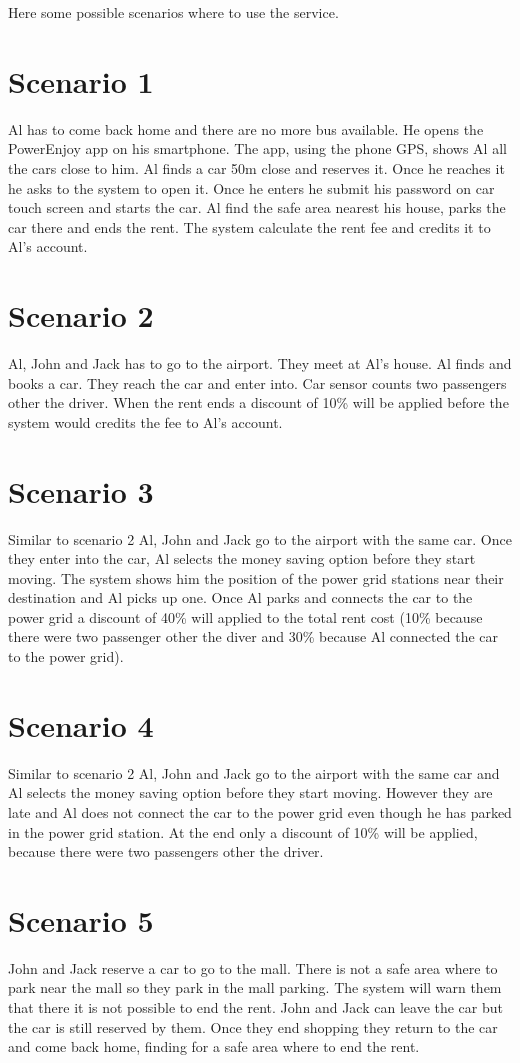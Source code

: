 Here some possible scenarios where to use the service.
\section{Scenario 1}
Al has to come back home and there are no more bus available. He opens the PowerEnjoy app on his smartphone. The app, using the phone GPS, shows Al all the cars close to him. Al finds a car 50m close and reserves it. Once he reaches it he asks to the system to open it. Once he enters he submit his password on car touch screen and starts the car. Al find the safe area nearest his house, parks the car there and ends the rent. The system calculate the rent fee and credits it to Al's account.
\section{Scenario 2}
Al, John and Jack has to go to the airport. They meet at Al's house. Al finds and books a car. They reach the car and enter into. Car sensor counts two passengers other the driver. When the rent ends a discount of 10\% will be applied before the system would credits the fee to Al's account.
\section{Scenario 3}
Similar to scenario 2 Al, John and Jack go to the airport with the same car. Once they enter into the car, Al selects the money saving option before they start moving. The system shows him the position of the power grid stations near their destination and Al picks up one. Once Al parks and connects the car to the power grid a discount of 40\% will applied to the total rent cost (10\% because there were two passenger other the diver and 30\% because Al connected the car to the power grid).
\section{Scenario 4}
Similar to scenario 2 Al, John and Jack go to the airport with the same car and Al selects the money saving option before they start moving. However they are late and Al does not connect the car to the power grid even though he has parked in the power grid station. At the end only a discount of 10\% will be applied, because there were two passengers other the driver.
\section{Scenario 5}
John and Jack reserve a car to go to the mall. There is not a safe area where to park near the mall so they park in the mall parking. The system will warn them that there it is not possible to end the rent. John and Jack can leave the car but the car is still reserved by them. Once they end shopping they return to the car and come back home, finding for a safe area where to end the rent.
